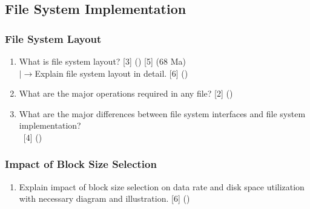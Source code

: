 \documentclass[12pt]{article}
\newcommand{\lb}{\\$\left|\rightarrow\right.$}
\newcommand{\enter}{\\\textcolor{white}{1}}
\begin{document}
	\subsection{File System Implementation}
		\subsubsection{File System Layout}
			\begin{enumerate}[noitemsep, topsep=0pt]
				\item What is file system layout? \hfill [3] () [5] (68 Ma)
				\lb Explain file system layout in detail. \hfill [6] ()

				\item What are the major operations required in any file? \hfill [2] ()

				\item What are the major differences between file system interfaces and file system implementation?
				\enter\hfill [4] ()
			\end{enumerate}					
		
		\subsubsection{Impact of Block Size Selection}
			\begin{enumerate}[noitemsep, topsep=0pt]
				\item Explain impact of block size selection on data rate and disk space utilization with necessary diagram and illustration. \hfill [6] ()
			\end{enumerate}
\end{document}
